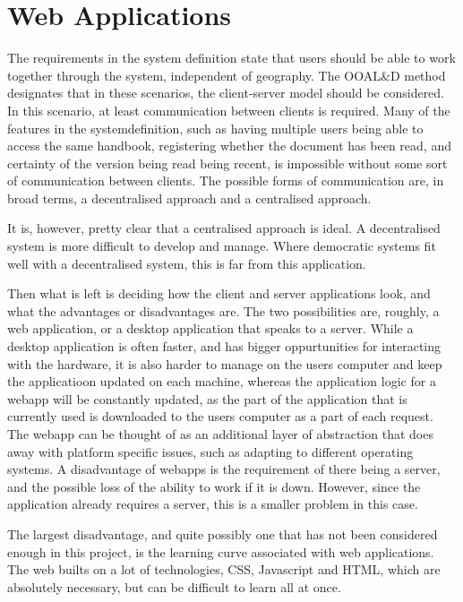 \section{Web Applications}
The requirements in the system definition state that users should be able to work together through the system, independent of geography.
The OOAL\&D method designates that in these scenarios, the client-server model should be considered.
In this scenario, at least communication between clients is required. Many of the features in the systemdefinition, such as having multiple users being able to access the same handbook, registering whether the document has been read, and certainty of the version being read being recent, is impossible without some sort of communication between clients. The possible forms of communication are, in broad terms, a decentralised approach and a centralised approach.

It is, however, pretty clear that a centralised approach is ideal. A decentralised system is more difficult to develop and manage. Where democratic systems fit well with a decentralised system, this is far from this application.

Then what is left is deciding how the client and server applications look, and what the advantages or disadvantages are. The two possibilities are, roughly, a web application, or a desktop application that speaks to a server. While a desktop application is often faster, and has bigger oppurtunities for interacting with the hardware, it is also harder to manage on the users computer and keep the applicatioon updated on each machine, whereas the application logic for a webapp will be constantly updated, as the part of the application that is currently used is downloaded to the users computer as a part of each request. The webapp can be thought of as an additional layer of abstraction that does away with platform specific issues, such as adapting to different operating systems. A disadvantage of webapps is the requirement of there being a server, and the possible loss of the ability to work if it is down. However, since the application already requires a server, this is a smaller problem in this case.

The largest disadvantage, and quite possibly one that has not been considered enough in this project, is the learning curve associated with web applications. The web builts on a lot of technologies, CSS, Javascript and HTML, which are absolutely necessary, but can be difficult to learn all at once.

